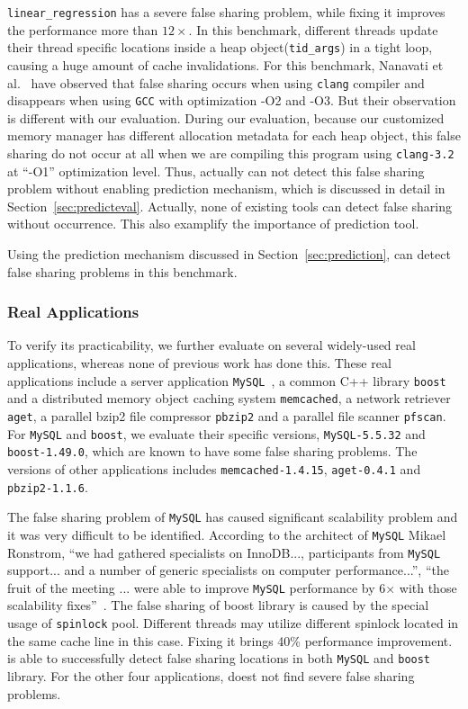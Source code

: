 \texttt{linear\_regression} has a severe false sharing problem, 
while fixing it improves the performance more than $12\times$.
In this benchmark, different threads update their thread specific locations 
inside a heap object(\texttt{tid\_args}) in a tight loop, 
causing a huge amount of cache invalidations. 
For this benchmark, Nanavati et al.~\cite{OSdetection} have observed that 
false sharing occurs when using \texttt{clang} compiler and 
disappears when using \texttt{GCC} with optimization -O2 and -O3.  
But their observation is different with our evaluation. 
During our evaluation, because our customized memory manager has different allocation 
metadata for each heap object, this false sharing do not 
occur at all when we are compiling this program
using \texttt{clang-3.2} at ``-O1'' optimization level.
Thus, \Predator{} actually can not detect this false sharing problem without enabling 
prediction mechanism, which is discussed in detail in Section~\ref{sec:predicteval}.
Actually, none of existing tools can detect false sharing without occurrence.
This also examplify the importance of prediction tool.

Using the prediction mechanism discussed in Section~\ref{sec:prediction},
\Predator{} can detect false sharing problems in this benchmark.

\subsubsection{Real Applications}
To verify its practicability, we further evaluate \Predator{} 
on several widely-used real applications, whereas none of previous work has done this.  
These real applications include a server application \texttt{MySQL}~\cite{mysql}, 
a common C++ library \texttt{boost}~\cite{libfalsesharing} 
and a distributed memory object caching system \texttt{memcached}, a network retriever \texttt{aget}, 
a parallel bzip2 file compressor \texttt{pbzip2} and a parallel file scanner \texttt{pfscan}.
For \texttt{MySQL} and \texttt{boost},
we evaluate their specific versions, \texttt{MySQL-5.5.32} and
\texttt{boost-1.49.0}, which are known to have some false sharing problems.
The versions of other applications includes \texttt{memcached-1.4.15},
\texttt{aget-0.4.1} and \texttt{pbzip2-1.1.6}.

The false sharing problem of \texttt{MySQL} has caused significant scalability problem and
it was very difficult to be identified. 
According to the architect of \texttt{MySQL} Mikael Ronstrom, ``we had gathered specialists on 
InnoDB..., participants from \texttt{MySQL} support... and a number of generic specialists on 
computer performance...'', ``the fruit of the meeting ... were able to 
improve \texttt{MySQL} performance by 6$\times$ with those scalability fixes''~\cite{mysql}. 
The false sharing of boost library is caused by the special usage of \texttt{spinlock} pool.
Different threads may utilize different spinlock located in the same cache line in this case.
Fixing it brings 40\% performance improvement. 
\Predator{} is able to successfully detect false sharing locations
in both \texttt{MySQL} and \texttt{boost} library. 
For the other four applications, \Predator{} doest not find severe false sharing problems.

